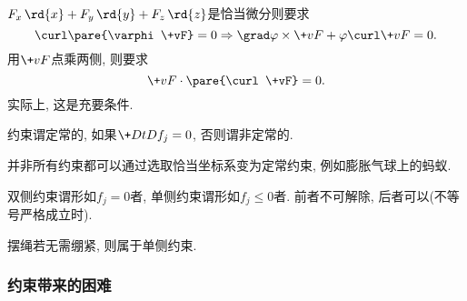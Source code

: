 \documentclass[../LectureNotes.tex]{subfiles}
\begin{document}
\begin{remark}[恰当微分的判定]
    \label{rm:恰当微分的判定}
    $F_x\,\rd{x} + F_y\,\rd{y} + F_z\,\rd{z}$是恰当微分则要求
    \[ \curl \pare{\varphi\+vF} = 0\Rightarrow \grad\varphi\times\+vF + \varphi\curl\+vF = 0. \]
    用$\+vF$点乘两侧, 则要求
    \[ \+vF\cdot\pare{\curl \+vF} = 0. \]
    实际上, 这是充要条件.
\end{remark}
\begin{definition}[定常约束]
    约束谓定常的, 如果$\+D{t}D{f_j} = 0$, 否则谓非定常的.
\end{definition}
\begin{ex}
    并非所有约束都可以通过选取恰当坐标系变为定常约束, 例如膨胀气球上的蚂蚁.
\end{ex}
\begin{definition}[双侧约束]
    双侧约束谓形如$f_j = 0$者, 单侧约束谓形如$f_j \le 0$者. 前者不可解除, 后者可以(不等号严格成立时).
\end{definition}
\begin{ex}
    摆绳若无需绷紧, 则属于单侧约束.
\end{ex}

\subsubsection{约束带来的困难} %
\label{ssub:约束带来的困难}
\end{document}
